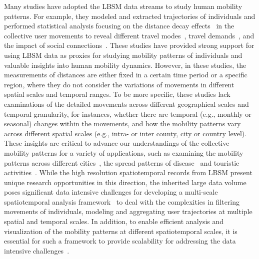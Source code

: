 \documentclass[a4paper, 11pt]{article}
\begin{document}
Many studies have adopted the LBSM data streams to study human mobility patterns. For example, they modeled and extracted trajectories of individuals and performed statistical analysis focusing on the distance decay effects~\citep{gonzalez2008understanding} in the collective user movements to reveal different travel modes~\citep{Jurdak2015}, travel demands~\citep{wu2014intra,hasan2013understanding}, and the impact of social connections~\citep{cho2011friendship}.
These studies have provided strong support for using LBSM data as proxies for studying mobility patterns of individuals and valuable insights into human mobility dynamics. 
However, in these studies, the measurements of distances are either fixed in a certain time period or a specific region, where they do not consider the variations of movements in different spatial scales and temporal ranges.
To be more specific, these studies lack examinations of the detailed movements across different geographical scales and temporal granularity, for instances, whether there are temporal (e.g., monthly or seasonal) changes within the movements, and how the mobility patterns vary across different spatial scales (e.g., intra- or inter county, city or country level). 
These insights are critical to advance our understandings of the collective mobility patterns for a variety of applications, such as examining the mobility patterns across different cities~\citep{noulas2012tale}, the spread patterns of disease~\citep{balcan2009multiscale, tamerius2011global} and touristic activities~\citep{hawelka2014geo}.
While the high resolution spatiotemporal records from LBSM present unique research opportunities in this direction, the inherited large data volume poses significant data intensive challenges for developing a multi-scale spatiotemporal analysis framework~\citep{tsou2015} to deal with the complexities in filtering movements of individuals, modeling and aggregating user trajectories at multiple spatial and temporal scales.
In addition, to enable efficient analysis and visualization of the mobility patterns at different spatiotemporal scales, it is essential for such a framework to provide scalability for addressing the data intensive challenges~\citep{cao2014scalable}. 
\end{document}

